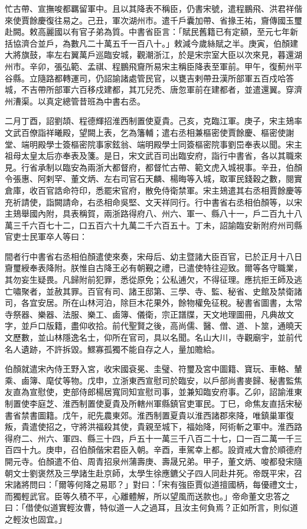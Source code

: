 \begin{pinyinscope}
忙古帶、宣撫唆都羈留軍中。且以其降表不稱臣，仍書宋號，遣程鵬飛、洪君祥偕來使賈餘慶復往易之。己丑，軍次湖州市。遣千戶囊加帶、省掾王祐，齎傳國玉璽赴闕。敕高麗國以有官子弟為質。中書省臣言：「賦民舊籍已有定額，至元七年新括協濟合並戶，為數凡二十萬五千一百八十。」敕減今歲絲賦之半。庚寅，伯顏建大將旗鼓，率左右翼萬戶巡臨安城，觀潮浙江，於是宋宗室大臣以次來見，暮還湖州市。辛卯，張弘範、孟祺、程鵬飛齎所易宋主稱臣降表至軍前。甲午，復薊州平谷縣。立隨路都轉運司，仍詔諭諸處管民官，以甕吉剌帶丑漢所部軍五百戍哈答城，不吉帶所部軍六百移戍建都，其兀兒禿、唐忽軍前在建都者，並遣還翼。穿濟州漕渠。以真定總管昔班為中書右丞。



 二月丁酉，詔劉頡、程德輝招淮西制置使夏貴。己亥，克臨江軍。庚子，宋主鳷率文武百僚詣祥曦殿，望闕上表，乞為籓輔；遣右丞相兼樞密使賈餘慶、樞密使謝堂、端明殿學士簽樞密院事家鉉翁、端明殿學士同簽樞密院事劉岊奉表以聞。宋主祖母太皇太后亦奉表及箋。是日，宋文武百司出臨安府，詣行中書省，各以其職來見。行省承制以臨安為兩浙大都督府，都督忙古帶、範文虎入城視事。辛丑，伯顏令張惠、阿剌罕、董文炳、左右司官石天麟、楊晦等入城，取軍民錢穀之數，閱實倉庫，收百官誥命符印，悉罷宋官府，散免侍衛禁軍。宋主鳷遣其右丞相賈餘慶等充祈請使，詣闕請命，右丞相命吳堅、文天祥同行。行中書省右丞相伯顏等，以宋主鳷舉國內附，具表稱賀，兩浙路得府八、州六、軍一、縣八十一，戶二百九十八萬三千六百七十二，口五百六十九萬二千六百五十。丁未，詔諭臨安新附府州司縣官吏士民軍卒人等曰：



 間者行中書省右丞相伯顏遣使來奏，宋母后、幼主暨諸大臣百官，已於正月十八日齎璽綬奉表降附。朕惟自古降王必有朝覲之禮，已遣使特往迎致。爾等各守職業，其勿妄生疑畏。凡歸附前犯罪，悉從原免；公私逋欠，不得征理。應抗拒王師及逃亡嘯聚者，並赦其罪。百官有司、諸王邸第、三學、寺、監、秘省、史館及禁衛諸司，各宜安居。所在山林河泊，除巨木花果外，餘物權免征稅。秘書省圖書，太常寺祭器、樂器、法服、樂工、鹵簿、儀衛，宗正譜牒，天文地理圖冊，凡典故文字，並戶口版籍，盡仰收拾。前代聖賢之後，高尚儒、醫、僧、道、卜筮，通曉天文歷數，並山林隱逸名士，仰所在官司，具以名聞。名山大川，寺觀廟宇，並前代名人遺跡，不許拆毀。鰥寡孤獨不能自存之人，量加贍給。



 伯顏就遣宋內侍王野入宮，收宋國袞冕、圭璧、符璽及宮中圖籍、寶玩、車輅、輦乘、鹵簿、麾仗等物。戊申，立浙東西宣慰司於臨安，以戶部尚書麥歸、秘書監焦友直為宣慰使，吏部侍郎楊居寬同知宣慰司事，並兼知臨安府事。乙卯，詔諭淮東制置使李庭芝、淮西制置使夏貴及所轄州軍縣鎮官吏軍民。丁巳，命焦友直括宋秘書省禁書圖籍。戊午，祀先農東郊。淮西制置夏貴以淮西諸郡來降，唯鎮巢軍復叛，貴遣使招之，守將洪福殺其使，貴親至城下，福始降，阿術斬之軍中。淮西路得府二、州六、軍四、縣三十四，戶五十一萬三千八百二十七，口一百二萬一千三百四十九。庚申，召伯顏偕宋君臣入朝。辛酉，車駕幸上都。設資戒大會於順德府開元寺。伯顏遣不伯、周青招泉州蒲壽庚、壽晟兄弟。甲子，董文炳、唆都發宋隨朝文士劉褒然及三學諸生赴京師，太學生徐應鑣父子四人同赴井死。帝既平宋，召宋諸將問曰：「爾等何降之易耶？」對曰：「宋有強臣賈似道擅國柄，每優禮文士，而獨輕武官。臣等久積不平，心離體解，所以望風而送款也。」帝命董文忠答之曰：「借使似道實輕汝曹，特似道一人之過耳，且汝主何負焉？正如所言，則似道之輕汝也固宜。」




\end{pinyinscope}
